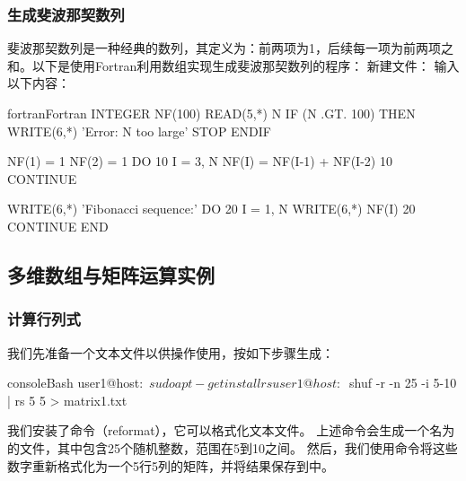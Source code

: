 \subsubsection{生成斐波那契数列}
斐波那契数列是一种经典的数列，其定义为：前两项为1，后续每一项为前两项之和。以下是使用Fortran利用数组实现生成斐波那契数列的程序：
新建文件：
输入以下内容：
\begin{envcode}{fortran}{Fortran}
      INTEGER NF(100)
      READ(5,*) N
      IF (N .GT. 100) THEN
        WRITE(6,*) 'Error: N too large'
        STOP
      ENDIF

      NF(1) = 1
      NF(2) = 1
      DO 10 I = 3, N
        NF(I) = NF(I-1) + NF(I-2)
   10 CONTINUE
      
      WRITE(6,*) 'Fibonacci sequence:'
      DO 20 I = 1, N
        WRITE(6,*) NF(I)
   20 CONTINUE
      END
\end{envcode}

\subsection{多维数组与矩阵运算实例}

\subsubsection{计算行列式}

我们先准备一个文本文件以供操作使用，按如下步骤生成：
\begin{envcode}{console}{Bash}
user1@host:~$ sudo apt-get install rs
user1@host:~$ shuf -r -n 25 -i 5-10 | rs 5 5 > matrix1.txt
\end{envcode}

我们安装了命令（reformat），它可以格式化文本文件。
上述命令会生成一个名为的文件，其中包含25个随机整数，范围在5到10之间。
然后，我们使用命令将这些数字重新格式化为一个5行5列的矩阵，并将结果保存到中。

